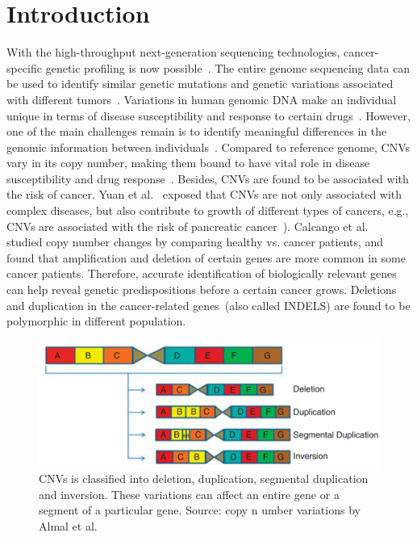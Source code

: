 \section{Introduction}
With the high-throughput next-generation sequencing technologies, cancer-specific genetic profiling is now possible~\cite{tomczak2015cancer,tcga}. The entire genome sequencing data can be used to identify similar genetic mutations and genetic variations associated with different tumors~\cite{82Tomczak}. 
Variations in human genomic DNA make an individual unique in terms of disease susceptibility and response to certain drugs~\cite{almal2012implications}. 
However, one of the main challenges remain is to identify meaningful differences in the genomic information between individuals~\cite{almal2012implications}. 
Compared to reference genome, CNVs  vary in its copy number, making them bound to have vital role in disease susceptibility and drug response~\cite{almal2012implications}.
Besides, CNVs are found to be associated with the risk of cancer. 
Yuan et al.~\cite{yuan2018cancer} exposed that  CNVs are not only associated with complex diseases, but also contribute to growth of different types of cancers, e.g., CNVs are associated with the risk of pancreatic cancer~\cite{66Huang}). Calcango et al.~\cite{67Calcagno} studied copy number changes by comparing healthy vs. cancer patients, and found that amplification and deletion of certain genes are more common in some cancer patients. Therefore, accurate identification of biologically relevant genes can help reveal genetic predispositions before a certain cancer grows. Deletions and duplication in the cancer-related genes~(also called INDELS) are found to be polymorphic in different population. 

\begin{figure}
	\centering
	\includegraphics[scale=0.6]{images/cnv_v1.png} 
	\caption[Copy number variations, showing deletion, duplication, and inversion]{CNVs is classified into deletion, duplication, segmental duplication and inversion. These variations can affect an entire gene or a segment of a particular gene. Source: copy n umber variations by Almal et al.~\cite{almal2012implications}}	
	\label{fig:cnv_v1}
	\vspace{-2mm}
\end{figure}

